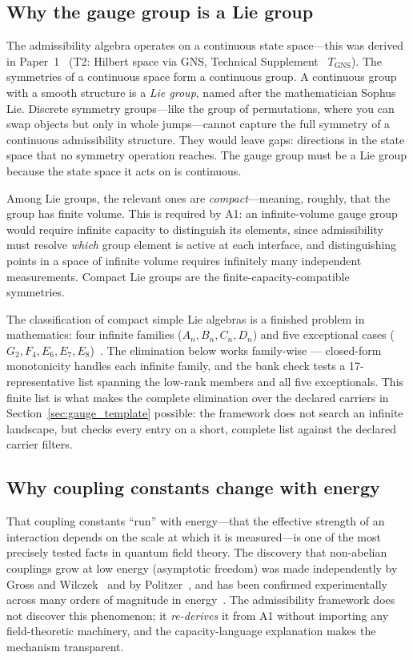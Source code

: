 \documentclass[11pt]{article}
\begin{document}
\subsection{Why the gauge group is a Lie group}

The admissibility algebra operates on a continuous state space---this was derived in Paper~1~\cite{BrookePaper1} (T2: Hilbert space via GNS, Technical Supplement~\cite{BrookeSupplement} $T_{\mathrm{GNS}}$).  The symmetries of a continuous space form a continuous group.  A continuous group with a smooth structure is a \emph{Lie group}, named after the mathematician Sophus Lie.  Discrete symmetry groups---like the group of permutations, where you can swap objects but only in whole jumps---cannot capture the full symmetry of a continuous admissibility structure.  They would leave gaps: directions in the state space that no symmetry operation reaches.  The gauge group must be a Lie group because the state space it acts on is continuous.

Among Lie groups, the relevant ones are \emph{compact}---meaning, roughly, that the group has finite volume.  This is required by A1: an infinite-volume gauge group would require infinite capacity to distinguish its elements, since admissibility must resolve \emph{which} group element is active at each interface, and distinguishing points in a space of infinite volume requires infinitely many independent measurements.  Compact Lie groups are the finite-capacity-compatible symmetries.

The classification of compact simple Lie algebras is a finished problem in mathematics: four infinite families ($A_n, B_n, C_n, D_n$) and five exceptional cases ($G_2, F_4, E_6, E_7, E_8$)~\cite{Humphreys1972}.  The elimination below works family-wise --- closed-form monotonicity handles each infinite family, and the bank check tests a 17-representative list spanning the low-rank members and all five exceptionals.  This finite list is what makes the complete elimination over the declared carriers in Section~\ref{sec:gauge_template} possible: the framework does not search an infinite landscape, but checks every entry on a short, complete list against the declared carrier filters.

\subsection{Why coupling constants change with energy}

That coupling constants ``run'' with energy---that the effective strength of an interaction depends on the scale at which it is measured---is one of the most precisely tested facts in quantum field theory.  The discovery that non-abelian couplings grow at low energy (asymptotic freedom) was made independently by Gross and Wilczek~\cite{GrossWilczek1973} and by Politzer~\cite{Politzer1973}, and has been confirmed experimentally across many orders of magnitude in energy~\cite{PDG2024}.  The admissibility framework does not discover this phenomenon; it \emph{re-derives} it from A1 without importing any field-theoretic machinery, and the capacity-language explanation makes the mechanism transparent.
\end{document}
